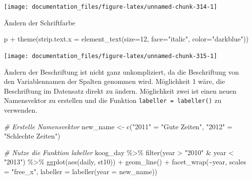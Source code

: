 \documentclass[
]{article}
\newenvironment{Shaded}{\begin{snugshade}}{\end{snugshade}}
\newcommand{\AttributeTok}[1]{\textcolor[rgb]{0.77,0.63,0.00}{#1}}
\newcommand{\CommentTok}[1]{\textcolor[rgb]{0.56,0.35,0.01}{\textit{#1}}}
\newcommand{\DecValTok}[1]{\textcolor[rgb]{0.00,0.00,0.81}{#1}}
\newcommand{\FunctionTok}[1]{\textcolor[rgb]{0.00,0.00,0.00}{#1}}
\newcommand{\NormalTok}[1]{#1}
\newcommand{\OtherTok}[1]{\textcolor[rgb]{0.56,0.35,0.01}{#1}}
\newcommand{\SpecialCharTok}[1]{\textcolor[rgb]{0.00,0.00,0.00}{#1}}
\newcommand{\StringTok}[1]{\textcolor[rgb]{0.31,0.60,0.02}{#1}}
\begin{document}
\begin{center}\texttt{[image: documentation\_files/figure-latex/unnamed-chunk-314-1]} \end{center}

Ändern der Schriftfarbe

\begin{Shaded}
\begin{Highlighting}[]
\NormalTok{p }\SpecialCharTok{+} \FunctionTok{theme}\NormalTok{(}\AttributeTok{strip.text.x =} \FunctionTok{element\_text}\NormalTok{(}\AttributeTok{size=}\DecValTok{12}\NormalTok{, }\AttributeTok{face=}\StringTok{"italic"}\NormalTok{, }\AttributeTok{color=}\StringTok{"darkblue"}\NormalTok{))}
\end{Highlighting}
\end{Shaded}

\begin{center}\texttt{[image: documentation\_files/figure-latex/unnamed-chunk-315-1]} \end{center}

Ändern der Beschriftung ist nicht ganz unkompliziert, da die Beschriftung von den Variablennamen der Spalten genommen wird. Möglichkeit 1 wäre, die Beschriftung im Datensatz direkt zu ändern. Möglichkeit zwei ist einen neuen Namensvektor zu erstellen und die Funktion \texttt{labeller\ =\ labeller()} zu verwenden.

\begin{Shaded}
\begin{Highlighting}[]
\CommentTok{\# Erstelle Namensvektor}
\NormalTok{new\_name }\OtherTok{\textless{}{-}} \FunctionTok{c}\NormalTok{(}\StringTok{"2011"} \OtherTok{=} \StringTok{"Gute Zeiten"}\NormalTok{, }\StringTok{"2012"} \OtherTok{=} \StringTok{"Schlechte Zeiten"}\NormalTok{)}

\CommentTok{\# Nutze die Funktion labeller}
\NormalTok{koog\_day }\SpecialCharTok{\%\textgreater{}\%}
  \FunctionTok{filter}\NormalTok{(year }\SpecialCharTok{\textgreater{}} \StringTok{"2010"} \SpecialCharTok{\&}\NormalTok{ year }\SpecialCharTok{\textless{}} \StringTok{"2013"}\NormalTok{) }\SpecialCharTok{\%\textgreater{}\%}
  \FunctionTok{ggplot}\NormalTok{(}\FunctionTok{aes}\NormalTok{(daily, st10)) }\SpecialCharTok{+}
  \FunctionTok{geom\_line}\NormalTok{() }\SpecialCharTok{+}
  \FunctionTok{facet\_wrap}\NormalTok{(}\SpecialCharTok{\textasciitilde{}}\NormalTok{year, }\AttributeTok{scales =} \StringTok{"free\_x"}\NormalTok{, }\AttributeTok{labeller =} \FunctionTok{labeller}\NormalTok{(}\AttributeTok{year =}\NormalTok{ new\_name))}
\end{Highlighting}
\end{Shaded}
\end{document}
